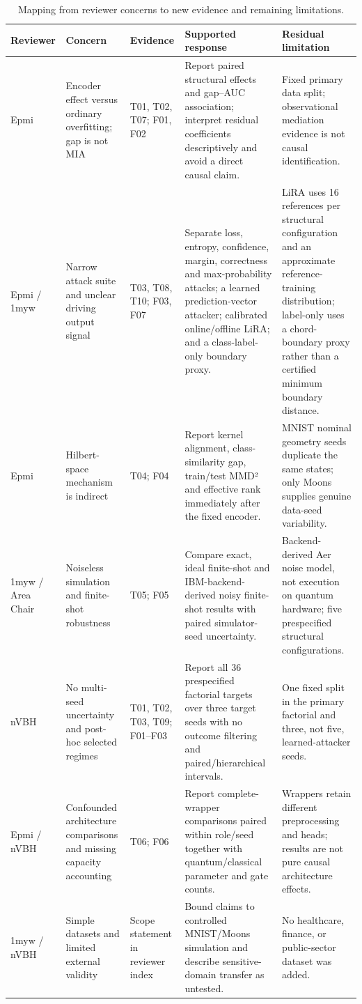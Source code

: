 \begin{table}[t]
\caption{Mapping from reviewer concerns to new evidence and remaining limitations.}
\label{tab:reviewer-evidence-map}
\begin{tabular}{lllll}
\toprule
Reviewer & Concern & Evidence & Supported response & Residual limitation \\
\midrule
Epmi & Encoder effect versus ordinary overfitting; gap is not MIA & T01, T02, T07; F01, F02 & Report paired structural effects and gap–AUC association; interpret residual coefficients descriptively and avoid a direct causal claim. & Fixed primary data split; observational mediation evidence is not causal identification. \\
Epmi / 1myw & Narrow attack suite and unclear driving output signal & T03, T08, T10; F03, F07 & Separate loss, entropy, confidence, margin, correctness and max-probability attacks; a learned prediction-vector attacker; calibrated online/offline LiRA; and a class-label-only boundary proxy. & LiRA uses 16 references per structural configuration and an approximate reference-training distribution; label-only uses a chord-boundary proxy rather than a certified minimum boundary distance. \\
Epmi & Hilbert-space mechanism is indirect & T04; F04 & Report kernel alignment, class-similarity gap, train/test MMD² and effective rank immediately after the fixed encoder. & MNIST nominal geometry seeds duplicate the same states; only Moons supplies genuine data-seed variability. \\
1myw / Area Chair & Noiseless simulation and finite-shot robustness & T05; F05 & Compare exact, ideal finite-shot and IBM-backend-derived noisy finite-shot results with paired simulator-seed uncertainty. & Backend-derived Aer noise model, not execution on quantum hardware; five prespecified structural configurations. \\
nVBH & No multi-seed uncertainty and post-hoc selected regimes & T01, T02, T03, T09; F01–F03 & Report all 36 prespecified factorial targets over three target seeds with no outcome filtering and paired/hierarchical intervals. & One fixed split in the primary factorial and three, not five, learned-attacker seeds. \\
Epmi / nVBH & Confounded architecture comparisons and missing capacity accounting & T06; F06 & Report complete-wrapper comparisons paired within role/seed together with quantum/classical parameter and gate counts. & Wrappers retain different preprocessing and heads; results are not pure causal architecture effects. \\
1myw / nVBH & Simple datasets and limited external validity & Scope statement in reviewer index & Bound claims to controlled MNIST/Moons simulation and describe sensitive-domain transfer as untested. & No healthcare, finance, or public-sector dataset was added. \\
\bottomrule
\end{tabular}
\end{table}
